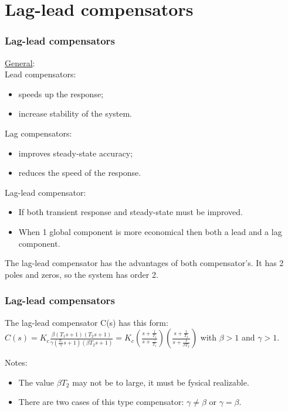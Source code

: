 \section{Lag-lead compensators}

\begin{frame}
	\frametitle{Lag-lead compensators}
		\underline{General}:\\
		Lead compensators: 
		\begin{itemize}
			\item speeds up the response;
			\item increase stability of the system.
		\end{itemize}
		Lag compensators:
		\begin{itemize}
			\item improves steady-state accuracy;
			\item reduces the speed of the response.
		\end{itemize}
		Lag-lead compensator:
		\begin{itemize}
			\item If both transient response and steady-state must be improved.
			\item When 1 global component is more economical then both a lead and a lag component.
		\end{itemize}
		The lag-lead compensator has the advantages of both compensator's. It has 2 poles and zeros, so the system has order 2.
\end{frame}

\begin{frame}
	\frametitle{Lag-lead compensators}
	The lag-lead compensator C(s) has this form: \\
	$C(s)=K_c\frac{\beta (T_1s+1)(T_2s+1)}{\gamma (\frac{T_1}{\gamma}s+1)(\beta T_2s+1)}=K_c(\frac{s+\frac{1}{T_1}}{s+\frac{\gamma}{T_1}})
	(\frac{s+\frac{1}{T_2}}{s+\frac{1}{\beta T_2}})$ with $\beta>1$ and $\gamma>1$.\vspace{4mm}
	
	Notes:
	\begin{itemize}
		\item The value $\beta T_2$ may not be to large, it must be fysical realizable.
		\item  There are two cases of this type compensator: $\gamma\neq \beta$ or $\gamma= \beta$.
	\end{itemize}
\end{frame}

